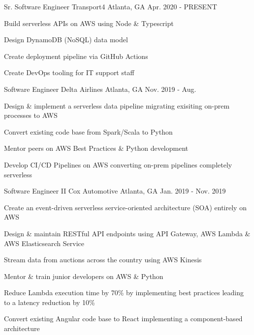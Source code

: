 
\begin{cventries}
  \cventry
    {Sr. Software Engineer} %
    {Transport4} %
    {Atlanta, GA} %
    {Apr. 2020 - PRESENT} %
    {
      \begin{cvitems} %
        \item {Build serverless APIs on AWS using Node \& Typescript}
        \item {Design DynamoDB (NoSQL) data model}
        \item {Create deployment pipeline via GitHub Actions}
        \item {Create DevOps tooling for IT support staff}
      \end{cvitems}
    }
    
  \cventry
    {Software Engineer} %
    {Delta Airlines} %
    {Atlanta, GA} %
    {Nov. 2019 - Aug.} %
    {
      \begin{cvitems} %
        \item {Design \& implement a serverless data pipeline migrating exisiting on-prem processes to AWS}
        \item {Convert existing code base from Spark/Scala to Python}
        \item {Mentor peers on AWS Best Practices \& Python development}
        \item {Develop CI/CD Pipelines on AWS converting on-prem pipelines completely serverless}
      \end{cvitems}
    }

  \cventry
    {Software Engineer II} %
    {Cox Automotive} %
    {Atlanta, GA} %
    {Jan. 2019 - Nov. 2019} %
    {
      \begin{cvitems} %
        \item {Create an event-driven serverless service-oriented architecture (SOA) entirely on AWS}
        \item {Design \& maintain RESTful API endpoints using API Gateway, AWS Lambda \& AWS Elasticsearch Service}
        \item {Stream data from auctions across the country using AWS Kinesis}
        \item {Mentor \& train junior developers on AWS \& Python}
        \item {Reduce Lambda execution time by 70\% by implementing best practices leading to a latency reduction by 10\%}
        \item {Convert existing Angular code base to React implementing a component-based architecture}
      \end{cvitems}
    }


\end{cventries}

